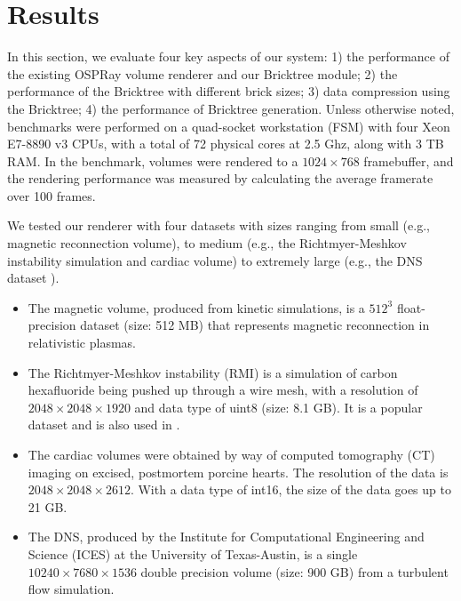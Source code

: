 \section{Results}
In this section, we evaluate four key aspects of our system: 1) the performance of the existing OSPRay
volume renderer and our Bricktree module; 2) the performance of the Bricktree with different brick sizes;
3) data compression using the Bricktree; 4) the performance of Bricktree generation. Unless otherwise noted,
benchmarks were performed on a quad-socket workstation (FSM) with four Xeon E7-8890 v3 CPUs, with a total
of 72 physical cores at 2.5 Ghz, along with 3 TB RAM.
In the benchmark, volumes were rendered to a
$1024 \times 768$ framebuffer, and the rendering performance was measured by calculating the average framerate over 100 frames. 

We tested our renderer with four datasets with sizes ranging from small (e.g., magnetic 
reconnection volume\cite{guo2014formation}), to medium (e.g., the Richtmyer-Meshkov instability simulation
\cite{cohen2002three} and cardiac volume\cite{scivisdata}) to extremely large (e.g., the DNS dataset \cite{moser1999direct}).
\begin{itemize}
\item The magnetic volume, produced from kinetic simulations, is a $512^3$ float-precision dataset
(size: 512 MB) that represents magnetic reconnection in relativistic plasmas. 
\item The Richtmyer-Meshkov instability (RMI) is a simulation of carbon hexafluoride being pushed up through a wire mesh, with a resolution of $2048 \times 2048 \times 1920$ and data type of uint8 (size: 8.1 GB). It is a popular dataset and is also used in \cite{fogal2013analysis, wu2018visit, knoll2006interactive}. 
\item The cardiac volumes were obtained by way of computed tomography (CT) imaging on excised,
postmortem porcine hearts. The resolution of the data is $2048 \times 2048 \times 2612$. With a data
type of int16, the size of the data goes up to 21 GB. 
\item The DNS, produced by the Institute for Computational Engineering and Science (ICES) at the University
of Texas-Austin, is a single $10240 \times 7680 \times 1536$ double precision volume (size: 900 GB) from a turbulent flow simulation. 
\end{itemize}

